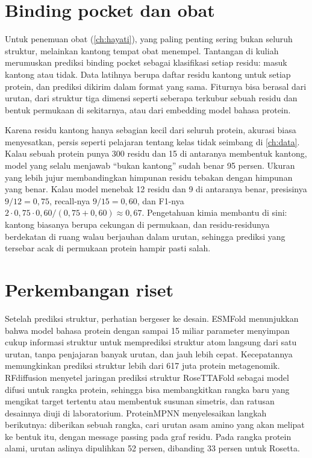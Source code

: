 \section{Binding pocket dan obat}

Untuk penemuan obat (\cref{ch:hayati}), yang paling penting sering bukan seluruh struktur, melainkan kantong tempat obat menempel.
Tantangan di kuliah merumuskan prediksi binding pocket sebagai klasifikasi setiap residu: masuk kantong atau tidak. Data latihnya
berupa daftar residu kantong untuk setiap protein, dan prediksi dikirim dalam format yang sama. Fiturnya bisa berasal dari urutan,
dari struktur tiga dimensi seperti seberapa terkubur sebuah residu dan bentuk permukaan di sekitarnya, atau dari embedding model
bahasa protein.

Karena residu kantong hanya sebagian kecil dari seluruh protein, akurasi biasa menyesatkan, persis seperti pelajaran tentang kelas
tidak seimbang di \cref{ch:data}. Kalau sebuah protein punya 300 residu dan 15 di antaranya membentuk kantong, model yang selalu
menjawab ``bukan kantong'' sudah benar 95 persen. Ukuran yang lebih jujur membandingkan himpunan residu tebakan dengan himpunan
yang benar. Kalau model menebak 12 residu dan 9 di antaranya benar, presisinya $9/12=0{,}75$, recall-nya $9/15=0{,}60$, dan F1-nya
$2\cdot0{,}75\cdot0{,}60/(0{,}75+0{,}60)\approx0{,}67$. Pengetahuan kimia membantu di sini: kantong biasanya berupa cekungan di
permukaan, dan residu-residunya berdekatan di ruang walau berjauhan dalam urutan, sehingga prediksi yang tersebar acak di
permukaan protein hampir pasti salah.

\section{Perkembangan riset}

Setelah prediksi struktur, perhatian bergeser ke desain. ESMFold \citep{lin2023esm} menunjukkan bahwa model bahasa protein
dengan sampai 15 miliar parameter menyimpan cukup informasi struktur untuk memprediksi struktur atom langsung dari satu
urutan, tanpa penjajaran banyak urutan, dan jauh lebih cepat. Kecepatannya memungkinkan prediksi struktur lebih dari 617
juta protein metagenomik. RFdiffusion \citep{watson2023} menyetel jaringan prediksi struktur RoseTTAFold sebagai model
difusi untuk rangka protein, sehingga bisa membangkitkan rangka baru yang mengikat target tertentu atau membentuk susunan
simetris, dan ratusan desainnya diuji di laboratorium. ProteinMPNN \citep{dauparas2022} menyelesaikan langkah berikutnya:
diberikan sebuah rangka, cari urutan asam amino yang akan melipat ke bentuk itu, dengan message passing pada graf residu.
Pada rangka protein alami, urutan aslinya dipulihkan 52 persen, dibanding 33 persen untuk Rosetta.

